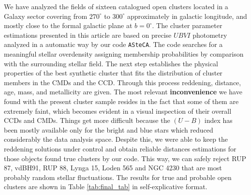 \documentclass[referee]{aa}
\begin{document}
We have analyzed the fields of sixteen catalogued open clusters located in a
Galaxy sector covering from $270^\circ$ to $300^\circ$ approximately in
galactic longitude, and mostly close to the formal galactic plane at
$b=0^\circ$.
The cluster parameter estimations presented in this article are based on
precise $UBVI$ photometry analyzed in a automatic way by our code 
\texttt{ASteCA}. The code searches for a meaningful stellar overdensity
assigning membership probabilities by comparison with the surrounding stellar
field.
The next step establishes the physical properties of the best synthetic cluster
that fits the distribution of cluster members in the CMDs and the CCD.
Through this process reddening, distance, age, mass, and metallicity are
given.
The most relevant \textbf{inconvenience} we have found with the present cluster
sample resides in the fact that some of them are extremely faint, which
becomes evident in a visual inspection of their overall CCDs and CMDs.
Things get more difficult because the $(U-B)$ index has been mostly available
only for the bright and blue stars which reduced considerably the data analysis
space. Despite this, we were able to keep the reddening solutions under control
and obtain reliable distances estimations for those objects found true clusters
by our code. This way, we can safely reject RUP 87, vdBH91, RUP 88, Lynga 15,
Loden 565 and NGC 4230 that are most probably random stellar fluctuations. The
results for true and probable open clusters are shown in Table 
\ref{tab:final_tab} in self-explicative format.
\end{document}
